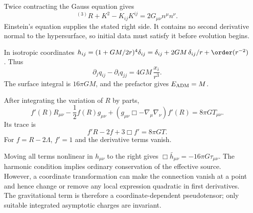 \begin{solutions}
\begin{solution}
Twice contracting the Gauss equation gives
\[
{}^{(3)}R+K^2-K_{ij}K^{ij}=2G_{\mu\nu}n^\mu n^\nu.
\]
Einstein's equation supplies the stated right side.  It contains no second
derivative normal to the hypersurface, so initial data must satisfy it before
evolution begins.
\end{solution}

\begin{solution}
In isotropic coordinates
\(h_{ij}=(1+GM/2r)^4\delta_{ij}
=\delta_{ij}+2GM\,\delta_{ij}/r+\order(r^{-2})\).
Thus
\[
\partial_jq_{ij}-\partial_iq_{jj}
=4GM\,\frac{x_i}{r^3}.
\]
The surface integral is \(16\pi GM\), and the prefactor gives
\(E_{\rm ADM}=M\).
\end{solution}

\begin{solution}
After integrating the variation of \(R\) by parts,
\[
f'(R)R_{\mu\nu}-\frac12f(R)g_{\mu\nu}
+(g_{\mu\nu}\Box-\nabla_\mu\nabla_\nu)f'(R)
=8\pi G T_{\mu\nu}.
\]
Its trace is
\[
f'R-2f+3\Box f'=8\pi GT.
\]
For \(f=R-2\Lambda\), \(f'=1\) and the derivative terms vanish.
\end{solution}

\begin{solution}
Moving all terms nonlinear in \(h_{\mu\nu}\) to the right gives
\(\Box\bar h_{\mu\nu}=-16\pi G\tau_{\mu\nu}\).
The harmonic condition implies ordinary conservation of the effective source.
However, a coordinate transformation can make the connection vanish at a
point and hence change or remove any local expression quadratic in first
derivatives.  The gravitational term is therefore a coordinate-dependent
pseudotensor; only suitable integrated asymptotic charges are invariant.
\end{solution}



\end{solutions}
